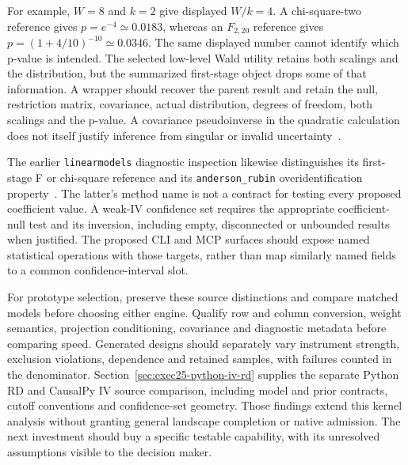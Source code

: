 For example, $W=8$ and $k=2$ give displayed $W/k=4$. A chi-square-two reference
gives $p=e^{-4}\simeq0.0183$, whereas an $F_{2,20}$ reference gives
$p=(1+4/10)^{-10}\simeq0.0346$. The same displayed number cannot identify
which p-value is intended. The selected low-level Wald utility retains both
scalings and the distribution, but the summarized first-stage object drops
some of that information. A wrapper should recover the parent result and
retain the null, restriction matrix, covariance, actual distribution, degrees
of freedom, both scalings and the p-value. A covariance pseudoinverse in the
quadratic calculation does not itself justify inference from singular or
invalid uncertainty~\citep{exec22_pyiv_kernels_pyfixest,exec22_pyiv_reference}.

The earlier \texttt{linearmodels} diagnostic inspection likewise distinguishes
its first-stage F or chi-square reference and its \texttt{anderson\_rubin}
overidentification property~\citep{exec22_pyiv_diagnostics_linearmodels}.
The latter's method name is not a contract for
testing every proposed coefficient value. A weak-IV confidence set requires
the appropriate coefficient-null test and its inversion, including empty,
disconnected or unbounded results when justified. The proposed CLI and MCP
surfaces should expose named statistical operations with those targets, rather
than map similarly named fields to a common confidence-interval slot.

For prototype selection, preserve these source distinctions and compare
matched models before choosing either engine. Qualify row and column conversion,
weight semantics, projection conditioning, covariance and diagnostic metadata
before comparing speed. Generated designs should separately vary instrument
strength, exclusion violations, dependence and retained samples, with failures
counted in the denominator. Section~\ref{sec:exec25-python-iv-rd} supplies the
separate Python RD and CausalPy IV source comparison, including model and prior
contracts, cutoff conventions and confidence-set geometry. Those findings
extend this kernel analysis without granting general landscape completion or
native admission. The next investment should buy a
specific testable capability, with its unresolved assumptions visible to the
decision maker.
